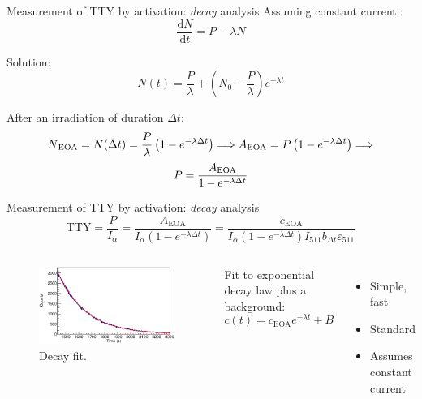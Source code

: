 \documentclass[11pt]{beamer}
\newcommand{\dif}{\text{d}}
\newcommand{\ddt}[1]{\frac{\dif #1}{\dif t}}
\begin{document}
\begin{frame}{Measurement of TTY by activation: \textit{decay} analysis}
	Assuming constant current:
	\begin{equation}
		\ddt{N} = P -\lambda N
	\end{equation}

	Solution:
	\begin{equation}
		N(t) = \frac{P}{\lambda} + \left(  N_0 - \frac{P}{\lambda}  \right) e^{-\lambda t}
	\end{equation}

	After an irradiation of duration $\Delta t$:
	\[ N\textsubscript{EOA} =N(\Delta t) = \frac{P}{\lambda} \left(1 - e^{-\lambda \Delta t} \right)\Longrightarrow A\textsubscript{EOA}=P\left(1-e^{-\lambda\Delta t}\right)\Longrightarrow \]
	\begin{equation}
		P = \frac{A\textsubscript{EOA}}{1 - e^{-\lambda \Delta t}}
	\end{equation}
\end{frame}

\begin{frame}{Measurement of TTY by activation: \textit{decay} analysis}
	\begin{equation}
		\text{TTY} = \frac{P}{I_\alpha} = \frac{A_\text{EOA}}{I_\alpha \left( 1-e^{-\lambda \Delta t}  \right)} = 
		\frac{c_\text{EOA}}{I_\alpha \left( 1-e^{-\lambda \Delta t}  \right) I_{511} b_{\Delta t} \varepsilon_{511}  }
	\end{equation}
	\begin{columns}
	\begin{figure}[H]
		\centering
		\includegraphics[width=\textwidth]{example_decay_fit.eps}
		\caption{Decay fit.}
		\label{decay_fit}
	\end{figure}
	Fit to exponential decay law plus a background:
	\begin{equation}
		c(t) = c_\text{EOA} e^{-\lambda t} + B
	\end{equation}
	\begin{itemize}
		\item Simple, fast
		\item Standard
		\item Assumes constant current
	\end{itemize}
	\end{columns}
\end{frame}
\end{document}
